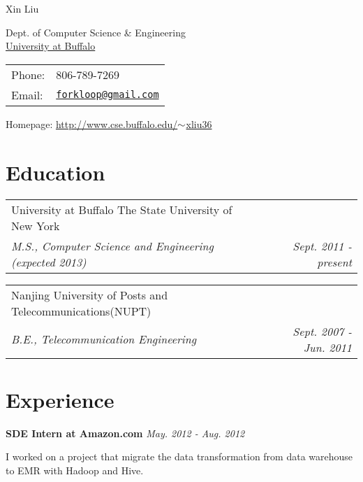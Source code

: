 \documentclass[letterpaper, 10pt]{article}
\makeatletter
\def\name{Xin Liu}
\renewenvironment{itemize}{
  \begin{list}{}{
    \setlength{\leftmargin}{1.5em}
  }
}{
  \end{list}
}
\newcommand{\ressubheading}[4]{
\begin{tabular*}{6.6in}{l@{\extracolsep{\fill}}r}
		#1 & #2 \\
		\textit{#3} & \textit{#4} \\
\end{tabular*}\vspace{-6pt}}
\makeatother
\begin{document}
{\huge \name}

\vspace{0.25in}
\begin{minipage}{0.65\textwidth}
Dept. of Computer Science \& Engineering\\
\href{http://www.buffalo.edu}{University at Buffalo}\\
\end{minipage}
\begin{minipage}{0.45\textwidth}\vspace{-0.1in}
\begin{tabular}{ll}
Phone: &806-789-7269 \\
Email: &\href{mailto:forkloop@gmail.com}{\tt forkloop@gmail.com} \\\end{tabular}
\end{minipage}
Homepage: \href{http://www.cse.buffalo.edu/~xliu36}{http://www.cse.buffalo.edu/$\small{\sim}$xliu36}

\section*{Education}
\begin{itemize}
\item
\ressubheading{University at Buffalo The State University of New York}{}{M.S., Computer Science and Engineering (expected 2013)}
{Sept. 2011 - present}

\item
\ressubheading{Nanjing University of Posts and Telecommunications(NUPT)}{}{B.E., Telecommunication Engineering}
{Sept. 2007 - Jun. 2011}
\end{itemize}

\section*{Experience}
\begin{itemize}
\item \textbf{SDE Intern at Amazon.com}
\hspace{3.4in} \textit{May. 2012 - Aug. 2012}
\begin{itemize}
\item{I worked on a project that migrate the data transformation from data warehouse to EMR with Hadoop and Hive.}
\end{itemize}
\end{itemize}
\end{document}
